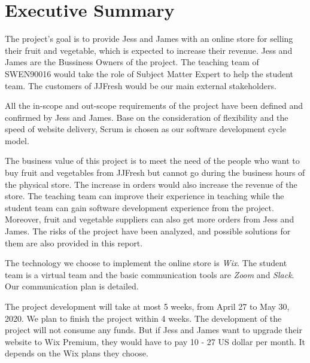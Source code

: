 \documentclass{report}
\begin{document}
\chapter*{Executive Summary}
  The project's goal is to provide Jess and James with an online store for selling their fruit and vegetable, which is expected to increase their revenue. Jess and James are the Bussiness Owners of the project. The teaching team of SWEN90016 would take the role of Subject Matter Expert to help the student team. The customers of JJFresh would be our main external stakeholders.

  All the in-scope and out-scope requirements of the project have been defined and confirmed by Jess and James. Base on the consideration of flexibility and the speed of website delivery, Scrum is chosen as our software development cycle model.

  The business value of this project is to meet the need of the people who want to buy fruit and vegetables from JJFresh but cannot go during the business hours of the physical store. The increase in orders would also increase the revenue of the store. The teaching team can improve their experience in teaching while the student team can gain software development experience from the project. Moreover, fruit and vegetable suppliers can also get more orders from Jess and James. The risks of the project have been analyzed, and possible solutions for them are also provided in this report. 

  The technology we choose to implement the online store is \textit{Wix}. The student team is a virtual team and the basic communication tools are \textit{Zoom} and \textit{Slack}. Our communication plan is detailed.

  The project development will take at most 5 weeks, from April 27 to May 30, 2020. We plan to finish the project within 4 weeks. The development of the project will not consume any funds. But if Jess and James want to upgrade their website to Wix Premium, they would have to pay 10 - 27 US dollar per month. It depends on the Wix plans they choose. 

\pagebreak
\clearpage

\tableofcontents
\pagebreak




 





\end{document}
